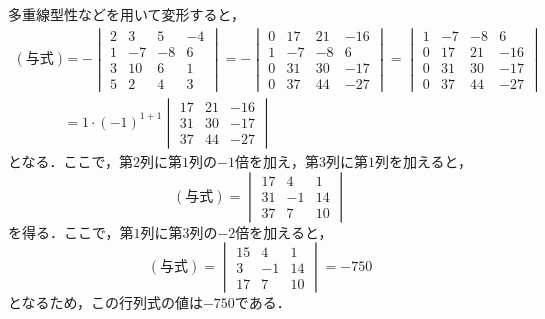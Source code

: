 \documentclass[a4paper,10pt,fleqn]{ltjsarticle}
\begin{document}
\begin{tleftbar}
    多重線型性などを用いて変形すると，
    \begin{align*}
        (\text{与式}) & = -
        \begin{vmatrix}
            2 & 3  & 5  & -4 \\
            1 & -7 & -8 & 6  \\
            3 & 10 & 6  & 1  \\
            5 & 2  & 4  & 3
        \end{vmatrix}
        = -
        \begin{vmatrix}
            0 & 17 & 21 & -16 \\
            1 & -7 & -8 & 6   \\
            0 & 31 & 30 & -17 \\
            0 & 37 & 44 & -27
        \end{vmatrix}
        =
        \begin{vmatrix}
            1 & -7 & -8 & 6   \\
            0 & 17 & 21 & -16 \\
            0 & 31 & 30 & -17 \\
            0 & 37 & 44 & -27
        \end{vmatrix}
        \\
                    & = 1 \cdot (-1)^{1+1}
        \begin{vmatrix}
            17 & 21 & -16 \\
            31 & 30 & -17 \\
            37 & 44 & -27
        \end{vmatrix}
    \end{align*}
    となる．ここで，第$2$列に第$1$列の$-1$倍を加え，第$3$列に第$1$列を加えると，
    \[
        (\text{与式}) =
        \begin{vmatrix}
            17 & 4  & 1  \\
            31 & -1 & 14 \\
            37 & 7  & 10
        \end{vmatrix}
    \]
    を得る．ここで，第$1$列に第$3$列の$-2$倍を加えると，
    \[
        (\text{与式})=
        \begin{vmatrix}
            15 & 4  & 1  \\
            3  & -1 & 14 \\
            17 & 7  & 10
        \end{vmatrix}
        = -750
    \]
    となるため，この行列式の値は$-750$である．
\end{tleftbar}
\end{document}
